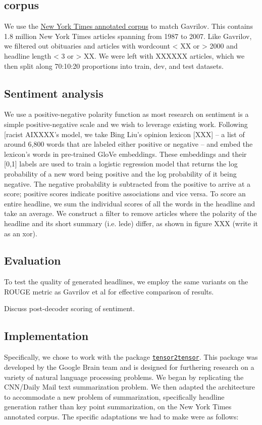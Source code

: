 \documentclass[11pt]{article}
\begin{document}
\subsection{corpus}
We use the \href{https://catalog.ldc.upenn.edu/LDC2008T19}{New York Times annotated corpus} to match Gavrilov. This contains 1.8 million New York Times articles spanning from 1987 to 2007. Like Gavrilov, we filtered out obituaries and articles with wordcount < XX or > 2000 and headline length < 3 or > XX. We were left with XXXXXX articles, which we then split along 70:10:20 proportions into train, dev, and test datasets.

\subsection{Sentiment analysis}
We use a positive-negative polarity function as most research on sentiment is a simple positive-negative scale and we wish to leverage existing work. Following [racist AIXXXX's model, we take Bing Liu's opinion lexicon [XXX] -- a list of around 6,800 words that are labeled either positive or negative -- and embed the lexicon's words in pre-trained GloVe embeddings. These embeddings and their [0,1] labels are used to train a logistic regression model that returns the log probability of a new word being positive and the log probability of it being negative. The negative probability is subtracted from the positive to arrive at a score; positive scores indicate positive associations and vice versa. To score an entire headline, we sum the individual scores of all the words in the headline and take an average. We construct a filter to remove articles where the polarity of the headline and its short summary (i.e. lede) differ, as shown in figure XXX (write it as an xor).

\subsection{Evaluation}
To test the quality of generated headlines, we employ the same variants on the ROUGE metric as Gavrilov et al for effective comparison of results.

Discuss post-decoder scoring of sentiment.

\subsection{Implementation}
Specifically, we chose to work with the package \href{https://github.com/tensorflow/tensor2tensor}{\texttt{tensor2tensor}}. This package was developed by the Google Brain team and is designed for furthering research on a variety of natural language processing problems. We began by replicating the CNN/Daily Mail text summarization problem. We then adapted the architecture to accommodate a new problem of summarization, specifically headline generation rather than key point summarization, on the New York Times annotated corpus. The specific adaptations we had to make were as follows:
\end{document}
